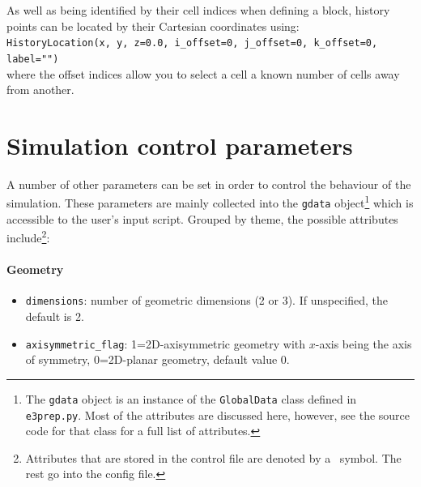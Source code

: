 \medskip
As well as being identified by their cell indices when defining a block,
history points can be located by their Cartesian coordinates using:\\
\texttt{HistoryLocation(x, y, z=0.0, i\_offset=0, j\_offset=0, k\_offset=0, label="")} \\
where the offset indices allow you to select a cell a known number of cells 
away from another.

\bigskip
\section{Simulation control parameters}
\label{sec:sim-control-parameters}
%
A number of other parameters can be set in order to control the behaviour of
the simulation.
These parameters are mainly collected into the \texttt{gdata}
object\footnote{The \texttt{gdata} object is an instance of the \texttt{GlobalData}
  class defined in \texttt{e3prep.py}. Most of the attributes are discussed here,
  however, see the source code for that class for a full list of attributes.} 
which is accessible to the user's input script.
Grouped by theme, the possible attributes include\footnote{Attributes that are stored in the control file
are denoted by a \ddag ~symbol.  The rest go into the config file.}:
\paragraph{Geometry}
\begin{itemize}
\item \texttt{dimensions}: number of geometric dimensions (2 or 3).  
  If unspecified, the default is 2.
\item \texttt{axisymmetric\_flag}: 1=2D-axisymmetric geometry with $x$-axis being the axis of symmetry,
  0=2D-planar geometry, default value 0.
\end{itemize}

